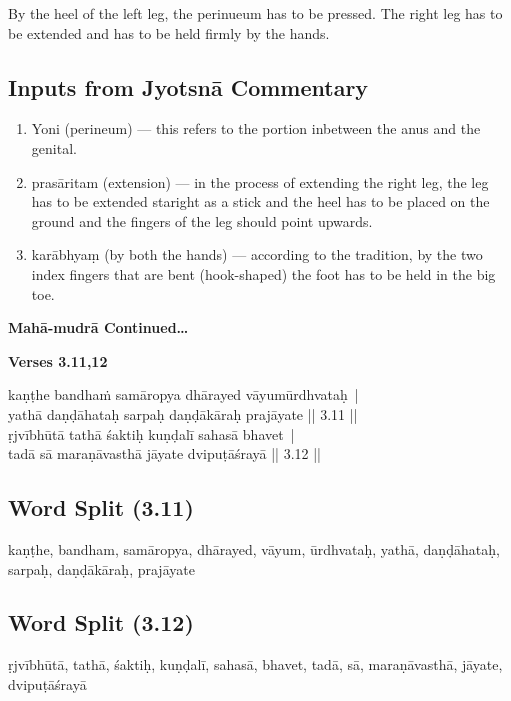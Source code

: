 By the heel of the left leg, the perinueum has to be pressed. The right leg has to be extended and has to be held firmly by the hands.    

\subsection*{Inputs from Jyotsnā Commentary}

\begin{enumerate}
\item Yoni (perineum) --- this refers to the portion inbetween the anus and the genital.
\item prasāritam (extension) --- in the process of extending the right leg, the leg has to be extended staright as a stick and the heel has to be placed on the ground and the fingers of the leg should point upwards. 
\item karābhyaṃ (by both the hands) --- according to the tradition, by the two index fingers that are bent (hook-shaped)  the foot has to be held in the big toe.  
\end{enumerate}

\begin{center}
\textbf{Mahā-mudrā Continued…}
\end{center}

\noindent \textbf{Verses 3.11,12}

\begin{shloka}
kaṇṭhe bandhaṁ samāropya dhārayed vāyumūrdhvataḥ |\\
yathā daṇḍāhataḥ sarpaḥ daṇḍākāraḥ prajāyate || 3.11 ||\\
ṛjvībhūtā tathā śaktiḥ kuṇḍalī sahasā bhavet |\\
tadā sā maraṇāvasthā jāyate dvipuṭāśrayā || 3.12 ||
\end{shloka}

\subsection*{Word Split (3.11)}

kaṇṭhe, bandham, samāropya, dhārayed, vāyum, ūrdhvataḥ, yathā, daṇḍāhataḥ, sarpaḥ, daṇḍākāraḥ, prajāyate

\subsection*{Word Split (3.12)}

ṛjvībhūtā,  tathā, śaktiḥ, kuṇḍalī, sahasā, bhavet, tadā, sā, maraṇāvasthā, jāyate, dvipuṭāśrayā

